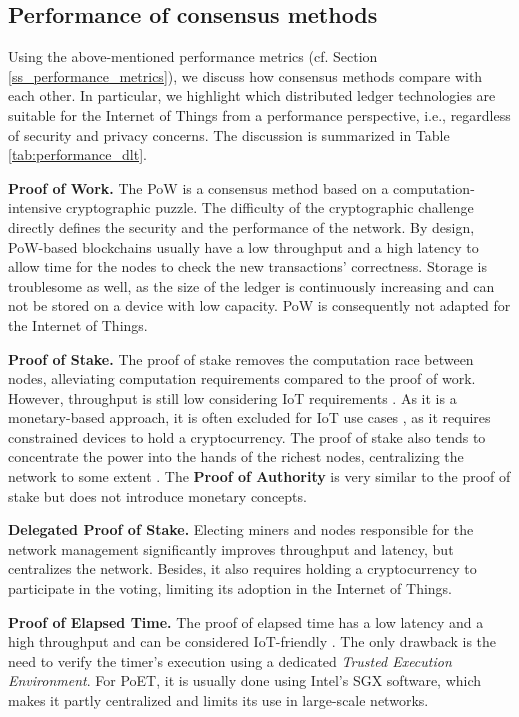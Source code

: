 \subsection{Performance of consensus methods}
\label{ss_performance_consensus_methods}

Using the above-mentioned performance metrics (cf. Section \ref{ss_performance_metrics}), we discuss how consensus methods compare with each other. In particular, we highlight which distributed ledger technologies are suitable for the Internet of Things from a performance perspective, i.e., regardless of security and privacy concerns. The discussion is summarized in Table \ref{tab:performance_dlt}.

\textbf{Proof of Work.} The PoW is a consensus method based on a computation-intensive cryptographic puzzle. The difficulty of the cryptographic challenge directly defines the security and the performance of the network. By design, PoW-based blockchains usually have a low throughput and a high latency to allow time for the nodes to check the new transactions' correctness. Storage is troublesome as well, as the size of the ledger is continuously increasing and can not be stored on a device with low capacity. PoW is consequently not adapted for the Internet of Things.

\textbf{Proof of Stake.} The proof of stake removes the computation race between nodes, alleviating computation requirements compared to the proof of work. However, throughput is still low considering IoT requirements \cite{Raghav2020}. As it is a monetary-based approach, it is often excluded for IoT use cases \cite{Raghav2020, Salimitari2020}, as it requires constrained devices to hold a cryptocurrency. The proof of stake also tends to concentrate the power into the hands of the richest nodes, centralizing the network to some extent \cite{Salimitari2020}. The \textbf{Proof of Authority} is very similar to the proof of stake but does not introduce monetary concepts.

\textbf{Delegated Proof of Stake.} Electing miners and nodes responsible for the network management significantly improves throughput and latency, but centralizes the network. Besides, it also requires holding a cryptocurrency to participate in the voting, limiting its adoption in the Internet of Things.

\textbf{Proof of Elapsed Time.} The proof of elapsed time has a low latency and a high throughput and can be considered IoT-friendly \cite{Salimitari2020}. The only drawback is the need to verify the timer's execution using a dedicated \emph{Trusted Execution Environment}. For PoET, it is usually done using Intel's SGX software, which makes it partly centralized and limits its use in large-scale networks.

